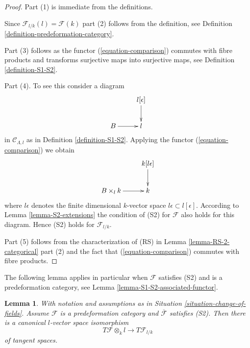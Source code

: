 \documentclass{stacks-project}
\theoremstyle{plain}
\newtheorem{lemma}[subsection]{Lemma}
\theoremstyle{definition}
\theoremstyle{remark}
\numberwithin{equation}{subsection}
\begin{document}
\begin{proof}
Part (1) is immediate from the definitions.

\medskip\noindent
Since $\mathcal{F}_{l/k}(l) = \mathcal{F}(k)$ part (2) follows from the
definition, see Definition \ref{definition-predeformation-category}.

\medskip\noindent
Part (3) follows as the functor (\ref{equation-comparison}) commutes with
fibre products and transforms surjective maps into surjective maps, see
Definition \ref{definition-S1-S2}.

\medskip\noindent
Part (4). To see this consider a diagram
$$
\xymatrix{
          & l[\epsilon] \ar[d] \\
B  \ar[r] & l
}
$$
in $\mathcal{C}_{\Lambda, l}$ as in Definition \ref{definition-S1-S2}.
Applying the functor (\ref{equation-comparison}) we obtain
$$
\xymatrix{
          & k[l\epsilon] \ar[d] \\
B \times_l k  \ar[r] & k
}
$$
where $l\epsilon$ denotes the finite dimensional $k$-vector space
$l\epsilon \subset l[\epsilon]$. According to Lemma \ref{lemma-S2-extensions}
the condition of (S2) for $\mathcal{F}$ also holds for this diagram.
Hence (S2) holds for $\mathcal{F}_{l/k}$.

\medskip\noindent
Part (5) follows from the characterization of (RS) in
Lemma \ref{lemma-RS-2-categorical} part (2) and the fact that
(\ref{equation-comparison}) commutes with fibre products.
\end{proof}

\noindent
The following lemma applies in particular when $\mathcal{F}$
satisfies (S2) and is a predeformation category, see
Lemma \ref{lemma-S1-S2-associated-functor}.

\begin{lemma}
\label{lemma-tangent-space-change-of-field}
With notation and assumptions as in Situation \ref{situation-change-of-fields}.
Assume $\mathcal{F}$ is a predeformation category and
$\overline{\mathcal{F}}$ satisfies (S2). Then there is a
canonical $l$-vector space isomorphism
$$
T\mathcal{F} \otimes_k l \longrightarrow T\mathcal{F}_{l/k}
$$
of tangent spaces.
\end{lemma}
\end{document}
